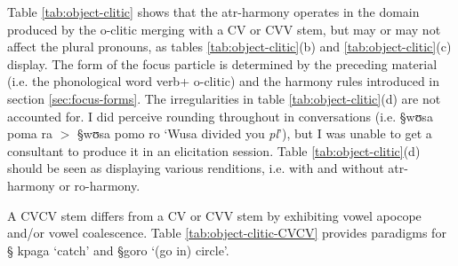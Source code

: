 Table \ref{tab:object-clitic} shows that the {\sc atr}-harmony 
operates in the domain produced by the {\sc
o}-clitic merging with a CV or CVV stem, but may or may not affect the
plural pronouns, as tables \ref{tab:object-clitic}(b) and 
\ref{tab:object-clitic}(c) display. The form of the focus particle is determined
by
the preceding material (i.e. the phonological word  verb+{\sc
o}-clitic) and the harmony rules introduced in
section
\ref{sec:focus-forms}.  The irregularities in table \ref{tab:object-clitic}(d)
are not accounted for.  I did perceive rounding throughout in conversations
(i.e.  {\S wʊsa poma ra} $>$ {\S wʊsa pomo ro} `Wusa divided you {\it pl}'), but
I was unable to get a consultant to produce it in an elicitation session. Table
\ref{tab:object-clitic}(d) should be seen as displaying various renditions,
i.e. with and without {\sc atr-}harmony or {\sc ro-}harmony.


A CVCV stem differs from a CV or CVV stem by exhibiting vowel apocope and/or 
vowel
coalescence.  Table \ref{tab:object-clitic-CVCV} provides paradigms for {\S
kpaga} `catch' and {\S goro} `(go in) circle'. 



